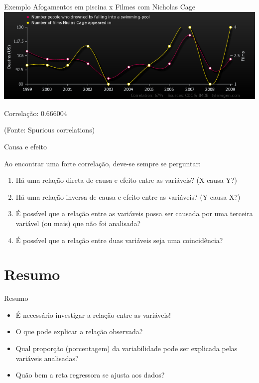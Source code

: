 \documentclass{beamer}
\begin{document}
\begin{frame}{Exemplo}
  Afogamentos em piscina x Filmes com Nicholas Cage
  \includegraphics[width=\textwidth]{Assoc/number-people-who-drowned-by-falling-into-a-swimming-pool_number-of-films-niclas-cage-appeared-in}

  Correlação: 0.666004

  (Fonte: Spurious correlations)
\end{frame}

\begin{frame}{Causa e efeito}

  Ao encontrar uma forte correlação, deve-se sempre se perguntar:

  \begin{enumerate}
  \item Há uma relação direta de causa e efeito entre as variáveis? (X
    causa Y?)

  \item Há uma relação inversa de causa e efeito entre as variáveis?
    (Y causa X?)

  \item É possível que a relação entre as variáveis possa ser causada
    por uma terceira variável (ou mais) que não foi analisada?

  \item É possível que a relação entre duas variáveis seja uma
    coincidência?
  \end{enumerate}
\end{frame}

\section{Resumo}
\begin{frame}{Resumo}
  \begin{itemize}
  \item É necessário investigar a relação entre as variáveis!
  \item O que pode explicar a relação observada?
  \item Qual proporção (porcentagem) da variabilidade pode ser
    explicada pelas variáveis analisadas?
  \item Quão bem a reta regressora se ajusta aos dados?
  \end{itemize}
\end{frame}

\end{document}
